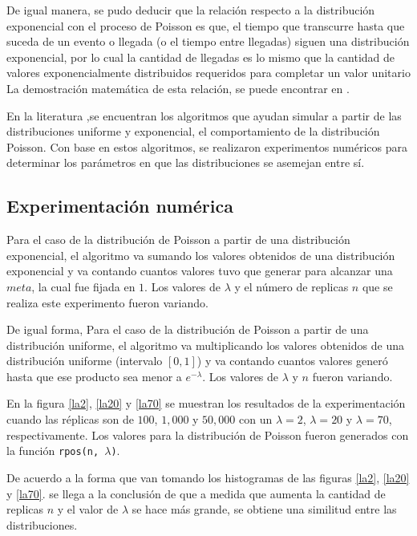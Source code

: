 \documentclass{article}
\begin{document}
De igual manera, se pudo deducir que la relación respecto a la distribución exponencial con el proceso de Poisson es que, el tiempo que transcurre hasta que suceda de un evento o llegada (o el tiempo entre llegadas) siguen una distribución exponencial, por lo cual la cantidad de llegadas es lo mismo que la cantidad de valores exponencialmente distribuidos requeridos para completar un valor unitario \cite{notasElisa} La demostración matemática de esta relación, se puede encontrar en \cite{taylor, walpole}.

En la literatura \cite{notasclase, knuth, devroye},se encuentran los algoritmos que ayudan simular a partir de las distribuciones uniforme y exponencial, el comportamiento de la distribución Poisson. Con base en estos algoritmos, se realizaron experimentos numéricos para determinar los parámetros en que las distribuciones se asemejan entre sí.
  
\subsection{Experimentación numérica}

Para el caso de la distribución de Poisson a partir de una distribución exponencial, el algoritmo va sumando los valores obtenidos de una distribución exponencial y va contando cuantos valores tuvo que generar para alcanzar una $meta$, la cual fue fijada en $1$. Los valores de $\lambda$ y el número de replicas $n$ que se realiza este experimento fueron variando.

De igual forma, Para el caso de la distribución de Poisson a partir de una distribución uniforme, el algoritmo va multiplicando los valores obtenidos de una distribución uniforme (intervalo $[0,1]$) y va contando cuantos valores generó hasta que ese producto sea menor a $e^{-\lambda}$. Los valores de $\lambda$ y $n$ fueron variando.

En la figura \ref{la2}, \ref{la20} y \ref{la70} se muestran los resultados de la experimentación cuando las réplicas son de $100$, $1,000$ y $50,000$ con un $\lambda = 2$, $\lambda = 20$ y $\lambda = 70$, respectivamente. Los valores para la distribución de Poisson fueron generados con la función \texttt{rpos(n, $\lambda$)}.

De acuerdo a la forma que van tomando los histogramas de las figuras \ref{la2}, \ref{la20} y \ref{la70}. se llega a la conclusión de que a medida que aumenta la cantidad de replicas $n$ y el valor de $\lambda$ se hace más grande, se obtiene una similitud entre las distribuciones.
\end{document}

